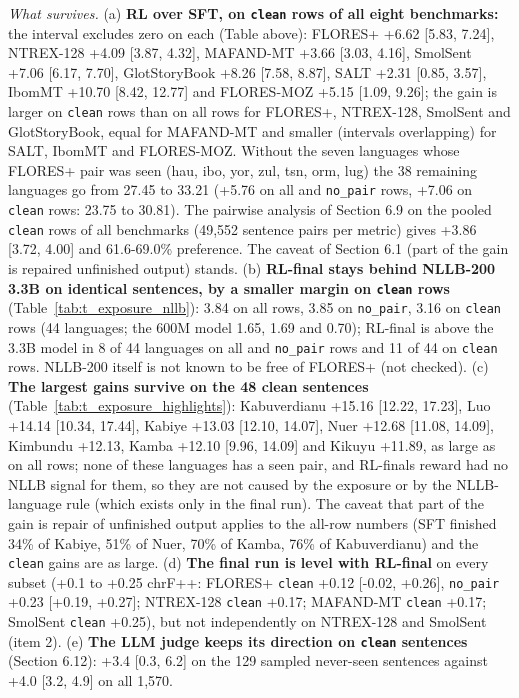 \emph{What survives.} (a) \textbf{RL over SFT, on \texttt{clean} rows of all eight benchmarks:} the interval excludes zero on each (Table above): FLORES+ +6.62 {[}5.83, 7.24{]}, NTREX-128 +4.09 {[}3.87, 4.32{]}, MAFAND-MT +3.66 {[}3.03, 4.16{]}, SmolSent +7.06 {[}6.17, 7.70{]}, GlotStoryBook +8.26 {[}7.58, 8.87{]}, SALT +2.31 {[}0.85, 3.57{]}, IbomMT +10.70 {[}8.42, 12.77{]} and FLORES-MOZ +5.15 {[}1.09, 9.26{]}; the gain is larger on \texttt{clean} rows than on all rows for FLORES+, NTREX-128, SmolSent and GlotStoryBook, equal for MAFAND-MT and smaller (intervals overlapping) for SALT, IbomMT and FLORES-MOZ. Without the seven languages whose FLORES+ pair was seen (hau, ibo, yor, zul, tsn, orm, lug) the 38 remaining languages go from 27.45 to 33.21 (+5.76 on all and \texttt{no\_pair} rows, +7.06 on \texttt{clean} rows: 23.75 to 30.81). The pairwise analysis of Section 6.9 on the pooled \texttt{clean} rows of all benchmarks (49,552 sentence pairs per metric) gives +3.86 {[}3.72, 4.00{]} and 61.6-69.0\% preference. The caveat of Section 6.1 (part of the gain is repaired unfinished output) stands. (b) \textbf{RL-final stays behind NLLB-200 3.3B on identical sentences, by a smaller margin on \texttt{clean} rows} (Table~\ref{tab:t_exposure_nllb}): 3.84 on all rows, 3.85 on \texttt{no\_pair}, 3.16 on \texttt{clean} rows (44 languages; the 600M model 1.65, 1.69 and 0.70); RL-final is above the 3.3B model in 8 of 44 languages on all and \texttt{no\_pair} rows and 11 of 44 on \texttt{clean} rows. NLLB-200 itself is not known to be free of FLORES+ (not checked). (c) \textbf{The largest gains survive on the 48 clean sentences} (Table~\ref{tab:t_exposure_highlights}): Kabuverdianu +15.16 {[}12.22, 17.23{]}, Luo +14.14 {[}10.34, 17.44{]}, Kabiye +13.03 {[}12.10, 14.07{]}, Nuer +12.68 {[}11.08, 14.09{]}, Kimbundu +12.13, Kamba +12.10 {[}9.96, 14.09{]} and Kikuyu +11.89, as large as on all rows; none of these languages has a seen pair, and RL-final\textquotesingle s reward had no NLLB signal for them, so they are not caused by the exposure or by the NLLB-language rule (which exists only in the final run). The caveat that part of the gain is repair of unfinished output applies to the all-row numbers (SFT finished 34\% of Kabiye, 51\% of Nuer, 70\% of Kamba, 76\% of Kabuverdianu) and the \texttt{clean} gains are as large. (d) \textbf{The final run is level with RL-final} on every subset (+0.1 to +0.25 chrF++: FLORES+ \texttt{clean} +0.12 {[}-0.02, +0.26{]}, \texttt{no\_pair} +0.23 {[}+0.19, +0.27{]}; NTREX-128 \texttt{clean} +0.17; MAFAND-MT \texttt{clean} +0.17; SmolSent \texttt{clean} +0.25), but not independently on NTREX-128 and SmolSent (item 2). (e) \textbf{The LLM judge keeps its direction on \texttt{clean} sentences} (Section 6.12): +3.4 {[}0.3, 6.2{]} on the 129 sampled never-seen sentences against +4.0 {[}3.2, 4.9{]} on all 1,570.

